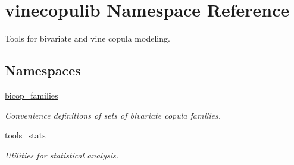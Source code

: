 \hypertarget{namespacevinecopulib}{}\section{vinecopulib Namespace Reference}
\label{namespacevinecopulib}


Tools for bivariate and vine copula modeling.  


\subsection*{Namespaces}
\begin{DoxyCompactItemize}
\item 
 \hyperlink{namespacevinecopulib_1_1bicop__families}{bicop\+\_\+families}
\begin{DoxyCompactList}\small\item\em Convenience definitions of sets of bivariate copula families. \end{DoxyCompactList}\item 
 \hyperlink{namespacevinecopulib_1_1tools__stats}{tools\+\_\+stats}
\begin{DoxyCompactList}\small\item\em Utilities for statistical analysis. \end{DoxyCompactList}\end{DoxyCompactItemize}
